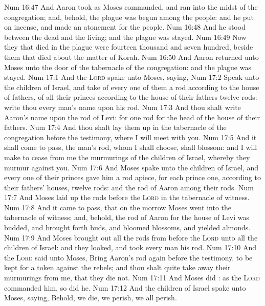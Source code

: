 \vs Num 16:47 And Aaron took as Moses commanded, and ran into the midst of the congregation; and, behold, the plague was begun among the people: and he put on incense, and made an atonement for the people.
\vs Num 16:48 And he stood between the dead and the living; and the plague was stayed.
\vs Num 16:49 Now they that died in the plague were fourteen thousand and seven hundred, beside them that died about the matter of Korah.
\vs Num 16:50 And Aaron returned unto Moses unto the door of the tabernacle of the congregation: and the plague was stayed.
\vs Num 17:1 And the \textsc{Lord} spake unto Moses, saying,
\vs Num 17:2 Speak unto the children of Israel, and take of every one of them a rod according to the house of  fathers, of all their princes according to the house of their fathers twelve rods: write thou every man's name upon his rod.
\vs Num 17:3 And thou shalt write Aaron's name upon the rod of Levi: for one rod  for the head of the house of their fathers.
\vs Num 17:4 And thou shalt lay them up in the tabernacle of the congregation before the testimony, where I will meet with you.
\vs Num 17:5 And it shall come to pass,  the man's rod, whom I shall choose, shall blossom: and I will make to cease from me the murmurings of the children of Israel, whereby they murmur against you.
\vs Num 17:6 And Moses spake unto the children of Israel, and every one of their princes gave him a rod apiece, for each prince one, according to their fathers' houses,  twelve rods: and the rod of Aaron  among their rods.
\vs Num 17:7 And Moses laid up the rods before the \textsc{Lord} in the tabernacle of witness.
\vs Num 17:8 And it came to pass, that on the morrow Moses went into the tabernacle of witness; and, behold, the rod of Aaron for the house of Levi was budded, and brought forth buds, and bloomed blossoms, and yielded almonds.
\vs Num 17:9 And Moses brought out all the rods from before the \textsc{Lord} unto all the children of Israel: and they looked, and took every man his rod.
\vs Num 17:10 And the \textsc{Lord} said unto Moses, Bring Aaron's rod again before the testimony, to be kept for a token against the rebels; and thou shalt quite take away their murmurings from me, that they die not.
\vs Num 17:11 And Moses did : as the \textsc{Lord} commanded him, so did he.
\vs Num 17:12 And the children of Israel spake unto Moses, saying, Behold, we die, we perish, we all perish.
